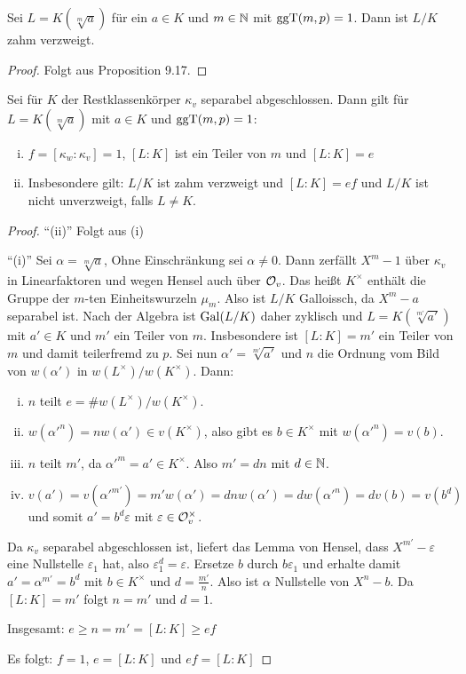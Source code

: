 \begin{Bsp}
	Sei $L=K(\sqrt[m]{a})$ für ein $a\in K$ und $m\in\mathbb{N}$ mit $\operatorname{ggT}(m,p) = 1$.
	Dann ist $L/K$ zahm verzweigt.
\end{Bsp}

\begin{proof}
	Folgt aus Proposition 9.17.
\end{proof}

\begin{Prop}
	Sei für $K$ der Restklassenkörper $\kappa_v$ separabel abgeschlossen. Dann gilt für $L=K(\sqrt[m]{a})$ mit $a\in K$ und $\operatorname{ggT}(m,p) = 1$:
	\begin{enumerate}[(i)]
		\item $f=[\kappa_w : \kappa_v] = 1$, $[L:K]$ ist ein Teiler von $m$ und $[L:K] = e$
		\item Insbesondere gilt: $L/K$ ist zahm verzweigt und $[L:K] = ef$ und $L/K$ ist nicht unverzweigt, falls $L\neq K$.
	\end{enumerate}
\end{Prop}

\begin{proof}
	\enquote{(ii)} Folgt aus (i)
	
	\bigskip \enquote{(i)} Sei $\alpha = \sqrt[m]{a}$, Ohne Einschränkung sei $\alpha \neq 0$.
	Dann zerfällt $X^m-1$ über $\kappa_v$ in Linearfaktoren und wegen Hensel auch über $\mathcal{O}_v$.
	Das heißt $K^\times$ enthält die Gruppe der $m$-ten Einheitswurzeln $\mu_m$.
	Also ist $L/K$ Galloissch, da $X^m-a$ separabel ist.
	Nach der Algebra ist $\operatorname{Gal}(L/K)$ daher zyklisch und $L=K(\sqrt[m']{a'})$ mit $a'\in K$ und $m'$ ein Teiler von $m$. Insbesondere ist $[L:K] = m'$ ein Teiler von $m$ und damit teilerfremd zu $p$.
	Sei nun $\alpha' = \sqrt[m']{a'}$ und $n$ die Ordnung vom Bild von $w(\alpha')$ in 
	$w(L^\times) / w(K^\times)$. Dann:
	\begin{enumerate}[(i)]
		\item $n$ teilt $e= \# w(L^\times) / w(K^\times)$.
		\item $w(\alpha'^n) = nw(\alpha') \in v(K^\times)$, also gibt es $b\in K^\times$ mit
		$w(\alpha'^n) = v(b)$.
		\item $n$ teilt $m'$, da $\alpha'^m = a' \in K^\times$. Also $m'=dn$ mit $d\in\mathbb{N}$.
		\item $v(a')=v(\alpha'^{m'}) = m'w(\alpha') = dnw(\alpha') = dw(\alpha'^n)
		=dv(b)=v(b^d)$ und somit $a'=b^d \varepsilon$ mit $\varepsilon\in\mathcal{O}_v^\times$.
	\end{enumerate}
	Da $\kappa_v$ separabel abgeschlossen ist, liefert das Lemma von Hensel, dass $X^{m'}-\varepsilon$ eine Nullstelle $\varepsilon_1$ hat, also $\varepsilon_1^d = \varepsilon$.
	Ersetze $b$ durch $b \varepsilon_1$ und erhalte damit $a' = \alpha^{m'} = b^d$ mit $b\in K^\times$ und $d = \frac{m'}{n}$.
	Also ist $\alpha$ Nullstelle von $X^n-b$.
	Da $[L:K] = m'$ folgt $n=m'$ und $d=1$.
	
	\bigskip Insgesamt: $e \geq n = m' = [L:K] \geq ef$
	
	Es folgt: $f=1$, $e=[L:K]$ und $ef = [L:K]$
\end{proof}